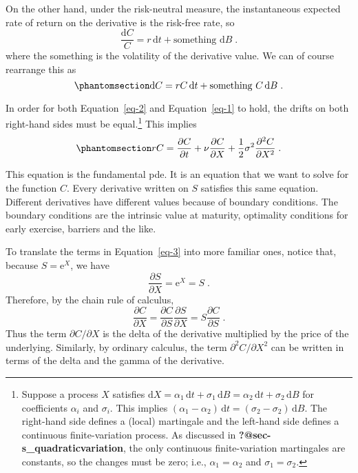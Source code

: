 \documentclass[
  letterpaper,
  DIV=11,
  numbers=noendperiod]{scrartcl}
\theoremstyle{definition}
\theoremstyle{remark}
\begin{document}
On the other hand, under the risk-neutral measure, the instantaneous
expected rate of return on the derivative is the risk-free rate, so
\[\frac{\mathrm{d} C}{C} =r\,\mathrm{d} t + \text{something}\,\,\mathrm{d} B\; .\]
where the something is the volatility of the derivative value. We can of
course rearrange this as \begin{equation}\phantomsection\label{eq-1}{
\mathrm{d} C = rC\,\mathrm{d} t+\text{something}\,\,C\,\mathrm{d} B\;.
}\end{equation}

In order for both Equation~\ref{eq-2} and Equation~\ref{eq-1} to hold,
the drifts on both right-hand sides must be equal.\footnote{Suppose a
  process \(X\) satisfies
  \(\mathrm{d} X=\alpha_1\,\mathrm{d} t+\sigma_1\,\mathrm{d} B = \alpha_2\,\mathrm{d} t+\sigma_2\,\mathrm{d} B\)
  for coefficients \(\alpha_i\) and \(\sigma_i\). This implies
  \((\alpha_1-\alpha_2)\,\mathrm{d} t=(\sigma_2-\sigma_2)\,\mathrm{d} B\).
  The right-hand side defines a (local) martingale and the left-hand
  side defines a continuous finite-variation process. As discussed in
  \textbf{?@sec-s\_quadraticvariation}, the only continuous
  finite-variation martingales are constants, so the changes must be
  zero; i.e., \(\alpha_1=\alpha_2\) and \(\sigma_1=\sigma_2\).} This
implies \begin{equation}\phantomsection\label{eq-3}{
rC = \frac{\partial C}{\partial t}+ \nu\frac{\partial C}{\partial X}+ \frac{1}{2}\sigma^2\frac{\partial^2 C}{\partial X^2}\;.
}\end{equation}

This equation is the fundamental pde. It is an equation that we want to
solve for the function \(C\). Every derivative written on \(S\)
satisfies this same equation. Different derivatives have different
values because of boundary conditions. The boundary conditions are the
intrinsic value at maturity, optimality conditions for early exercise,
barriers and the like.

To translate the terms in Equation~\ref{eq-3} into more familiar ones,
notice that, because \(S=\mathrm{e}^X\), we have \[
\frac{\partial S}{\partial X}=\mathrm{e}^X=S\;.
\] Therefore, by the chain rule of calculus, \[
\frac{\partial C}{\partial X} = \frac{\partial C}{\partial S}\frac{\partial S}{\partial X} = S\frac{\partial C}{\partial S}\;.\]
Thus the term \(\partial C/\partial X\) is the delta of the derivative
multiplied by the price of the underlying. Similarly, by ordinary
calculus, the term \(\partial^2 C/\partial X^2\) can be written in terms
of the delta and the gamma of the derivative.
\end{document}
